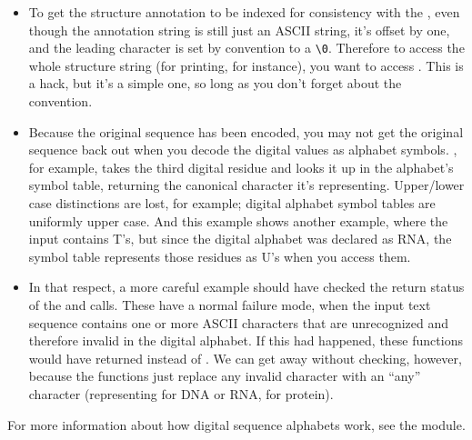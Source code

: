 \begin{itemize}
\item To get the structure annotation to be indexed  for
  consistency with the , even though the annotation string
  is still just an ASCII string, it's offset by one, and the leading
  character is set by convention to a \verb+\0+. Therefore to access
  the whole structure string (for printing, for instance), you want to
  access . This is a hack, but it's a simple one, so
  long as you don't forget about the convention.

\item Because the original sequence has been encoded, you may not get
  the original sequence back out when you decode the digital values as
  alphabet symbols. , for example, takes
  the third digital residue and looks it up in the alphabet's symbol
  table, returning the canonical character it's
  representing. Upper/lower case distinctions are lost, for example;
  digital alphabet symbol tables are uniformly upper case. And this
  example shows another example, where the input 
  contains T's, but since the digital alphabet was declared as RNA,
  the symbol table represents those residues as U's when you access
  them.

\item In that respect, a more careful example should have checked the
  return status of the  and
   calls. These have a normal failure
  mode, when the input text sequence contains one or more ASCII
  characters that are unrecognized and therefore invalid in the
  digital alphabet. If this had happened, these functions would have
  returned  instead of . We can get away
  without checking, however, because the functions just replace any
  invalid character with an ``any'' character (representing 
  for DNA or RNA,  for protein).
\end{itemize}

For more information about how digital sequence alphabets work, see
the  module.
